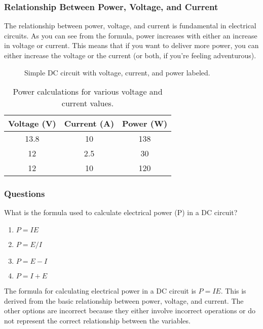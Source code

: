 \subsubsection*{Relationship Between Power, Voltage, and Current}
The relationship between power, voltage, and current is fundamental in electrical circuits. As you can see from the formula, power increases with either an increase in voltage or current. This means that if you want to deliver more power, you can either increase the voltage or the current (or both, if you're feeling adventurous).

\begin{figure}[h]
    \centering
    \caption{Simple DC circuit with voltage, current, and power labeled.}
    \label{fig:dc-circuit}
\end{figure}

\begin{table}[h]
    \centering
    \begin{tabular}{|c|c|c|}
        \hline
        Voltage (V) & Current (A) & Power (W) \\
        \hline
        13.8 & 10 & 138 \\
        12 & 2.5 & 30 \\
        12 & 10 & 120 \\
        \hline
    \end{tabular}
    \caption{Power calculations for various voltage and current values.}
    \label{tab:power-calculations}
\end{table}

\subsubsection*{Questions}
\begin{tcolorbox}[colback=gray!10!white,colframe=black!75!black,title={T5C08}]
    What is the formula used to calculate electrical power (P) in a DC circuit?
    \begin{enumerate}[label=\Alph*),noitemsep]
        \item \( P = I E \)
        \item \( P = E / I \)
        \item \( P = E - I \)
        \item \( P = I + E \)
    \end{enumerate}
\end{tcolorbox}
The formula for calculating electrical power in a DC circuit is \( P = I E \). This is derived from the basic relationship between power, voltage, and current. The other options are incorrect because they either involve incorrect operations or do not represent the correct relationship between the variables.

